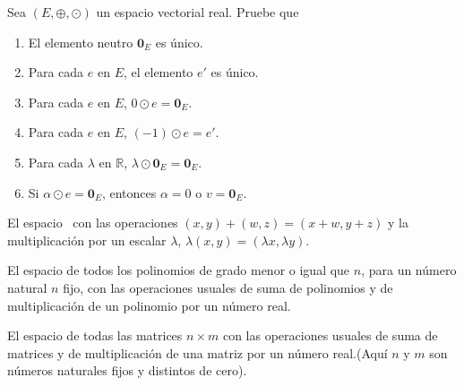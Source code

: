\newpage
\begin{trabajoautonomo}
Sea $(E, \oplus, \odot)$ un espacio vectorial real. Pruebe que
\begin{enumerate}
\item El elemento neutro $\mathbf{0}_E$ es único.
\item Para cada $e$ en $E$, el elemento $e'$ es único.
\item Para cada $e$ en $E$, $0 \odot e = \mathbf{0}_E$.
\item Para cada $e$ en $E$, $(-1) \odot e = e'$.
\item Para cada $\lambda$ en $\mathbb{R}$, $\lambda \odot \mathbf{0}_E = \mathbf{0}_E$.
\item Si $\alpha \odot e = \mathbf{0}_E$, entonces $\alpha = 0$ o $v=\mathbf{0}_E$.

\end{enumerate}
\end{trabajoautonomo}
\begin{ejemplo}

El espacio \rdos \ con las operaciones $(x,y)+(w,z) = (x+w,y+z)$ y la multiplicación por un escalar $\lambda$, $\lambda (x,y) = (\lambda x,\lambda y)$.

\end{ejemplo}

\begin{ejemplo}
El espacio de todos los polinomios de grado menor o igual que $n$, para un número natural $n$ fijo, con las operaciones usuales de suma de polinomios y de multiplicación de un polinomio por un número real.
\end{ejemplo}

\begin{ejemplo}
El espacio de todas las matrices $n \times m$ con las operaciones usuales de suma de matrices y de multiplicación de una matriz por un número real.(Aquí $n$ y $m$ son números naturales fijos y distintos de cero).


\end{ejemplo}

